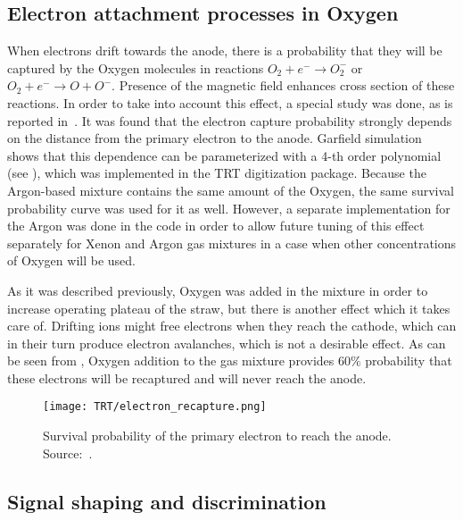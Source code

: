 \subsection{Electron attachment processes in Oxygen}
\label{subsec:recapture}
When electrons drift towards the anode, there is a probability that they will be captured by the Oxygen molecules in reactions
$O_2 + e^- \to O_2^-$ or $O_2 + e^- \to O + O^-$. Presence of the magnetic field enhances cross section of these reactions.
In order to take into account this effect, a special study was done, as is reported in~\cite{esben_thesis}.
It was found that the electron capture probability strongly depends on the distance from the primary electron to the anode.
Garfield simulation shows that this dependence can be parameterized with a 4-th order polynomial (see ), 
which was implemented in the TRT digitization package. 
Because the Argon-based mixture contains the same amount of the Oxygen, the same survival probability
curve was used for it as well. However, a separate implementation for the Argon was done in the code in order to allow future tuning of this effect separately for Xenon and Argon gas mixtures
in a case when other concentrations of Oxygen will be used.

As it was described previously, Oxygen was added in the mixture in order to increase operating plateau of the straw, but there is another effect which it takes care of.
Drifting ions might free electrons when they reach the cathode, which can in their turn produce electron avalanches, which is not a desirable effect.
As can be seen from , Oxygen addition to the gas mixture provides 60$\%$ probability that these electrons will be recaptured 
and will never reach the anode. 

\begin{figure}
\centering
\texttt{[image: TRT/electron\_recapture.png]}
\caption{ 
 Survival probability of the primary electron to reach the anode. Source:~\cite{esben_thesis}.
}
\label{fig:electron_recapture}
\end{figure}

\subsection{Signal shaping and discrimination}

